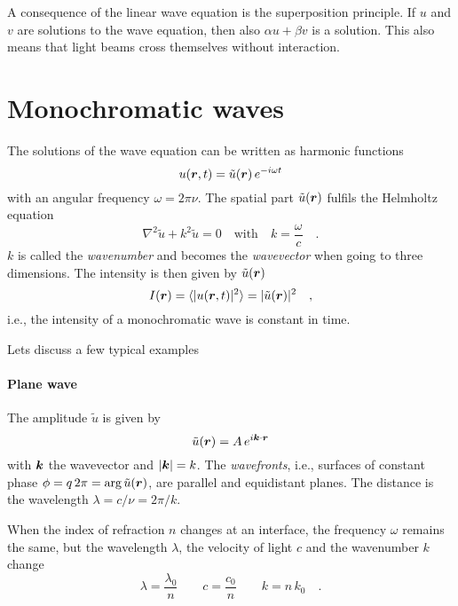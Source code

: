 A consequence of the linear wave equation is the superposition principle. If $u$ and $v$ are solutions to the wave equation, then also $\alpha u + \beta v$ is a solution. This also means that light beams cross themselves without interaction.


\section{Monochromatic waves}

The solutions of the wave equation can be written as harmonic functions
\begin{equation}
    u(\boldsymbol{r}, t)  = \tilde{u}(\boldsymbol{r}) \, e^{- i \omega t}
\end{equation}
with an angular frequency $\omega = 2 \pi \nu$. The spatial part $\tilde{u}(\boldsymbol{r})$ fulfils the Helmholtz equation
\begin{equation}
    \nabla^2 \tilde{u} + k^2 \tilde{u} = 0 \quad \text{with} \quad k = \frac{\omega}{c} \quad .
\end{equation}
$k$ is called the \emph{wavenumber} and becomes the \emph{wavevector} when going to three dimensions. The intensity is then given by $\tilde{u}(\boldsymbol{r})$
\begin{equation}
    I(\boldsymbol{r}) = \braket{ |u(\boldsymbol{r}, t) |^2 } = |\tilde{u}(\boldsymbol{r}) |^2 \quad , 
\end{equation}
i.e., the intensity of a monochromatic wave is constant in time. 

Lets discuss a few typical examples

\paragraph*{Plane wave} The amplitude $\tilde{u}$ is given by
\begin{equation}
 \tilde{u}(\boldsymbol{r}) = A \, e^{i \boldsymbol{k} \cdot \boldsymbol{r}}
\end{equation}
with $\boldsymbol{k}$ the wavevector and $|\boldsymbol{k}| = k $. The \emph{wavefronts}, i.e., surfaces of constant phase $\phi = q \, 2 \pi =  \arg \tilde{u}(\boldsymbol{r})$, are parallel and equidistant planes. The distance is the wavelength $\lambda = c / \nu = 2 \pi / k$.

When the index of refraction $n$ changes at an interface, the frequency $\omega$ remains the same, but the wavelength $\lambda$, the velocity of light $c$ and the wavenumber $k$ change
\begin{equation}
\lambda = \frac{\lambda_0}{n} \qquad
c = \frac{c_0}{n} \qquad
k = n \, k_0 \quad .
\end{equation}
 


